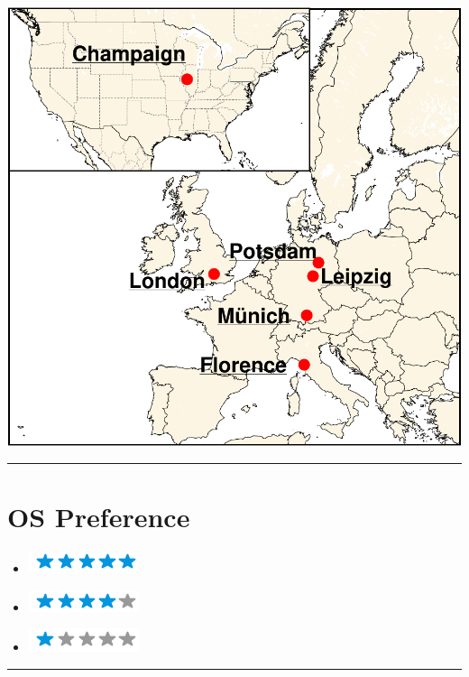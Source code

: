 \documentclass{article}
\begin{document}
\begin{minipage}[t]{0.27\textwidth}
	\includegraphics[trim=0.2cm 0.2cm 0.2cm 0.2cm, clip,scale=0.3, frame]{../img/globalEXPENG.pdf}
	\vspace{2mm}
	\hrule
	\vspace{-3mm}
	\section*{\fontsize{18pt}{24pt}\selectfont \color{pblue} OS Preference}
	\vspace{-2mm}
	\begin{itemize}
	\centering
	\item[\textbf{\LARGE \faLinux}]\includegraphics[trim=0.2cm 0.2cm 0.1cm 0.1cm,clip,scale=0.7]{../img/5stars.png}\vspace{-2mm}
	\item[\textbf{\LARGE \faWindows}]\includegraphics[trim=0.2cm 0.2cm 0.1cm 0.1cm,clip,scale=0.7]{../img/4stars.png}\vspace{-2mm}
    \item[\textbf{\LARGE \faApple}]\includegraphics[trim=0.2cm 0.2cm 0.1cm 0.1cm,clip,scale=0.7]{../img/1stars.png}
    \end{itemize}
	\hrule
	\vspace{-2mm}

\end{minipage}
\end{document}
